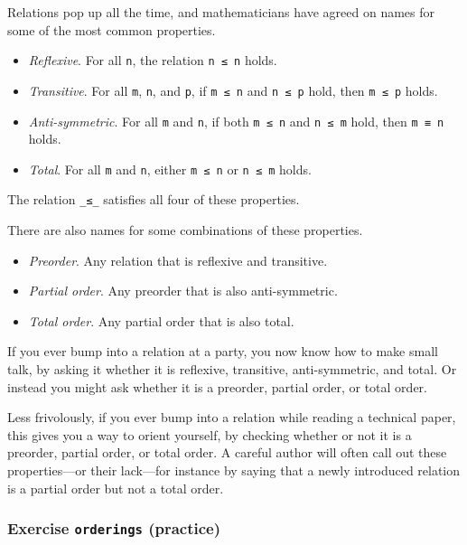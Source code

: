 Relations pop up all the time, and mathematicians have agreed on names
for some of the most common properties.

\begin{itemize}
\tightlist
\item
  \emph{Reflexive}. For all \texttt{n}, the relation \texttt{n\ ≤\ n}
  holds.
\item
  \emph{Transitive}. For all \texttt{m}, \texttt{n}, and \texttt{p}, if
  \texttt{m\ ≤\ n} and \texttt{n\ ≤\ p} hold, then \texttt{m\ ≤\ p}
  holds.
\item
  \emph{Anti-symmetric}. For all \texttt{m} and \texttt{n}, if both
  \texttt{m\ ≤\ n} and \texttt{n\ ≤\ m} hold, then \texttt{m\ ≡\ n}
  holds.
\item
  \emph{Total}. For all \texttt{m} and \texttt{n}, either
  \texttt{m\ ≤\ n} or \texttt{n\ ≤\ m} holds.
\end{itemize}

The relation \texttt{\_≤\_} satisfies all four of these properties.

There are also names for some combinations of these properties.

\begin{itemize}
\tightlist
\item
  \emph{Preorder}. Any relation that is reflexive and transitive.
\item
  \emph{Partial order}. Any preorder that is also anti-symmetric.
\item
  \emph{Total order}. Any partial order that is also total.
\end{itemize}

If you ever bump into a relation at a party, you now know how to make
small talk, by asking it whether it is reflexive, transitive,
anti-symmetric, and total. Or instead you might ask whether it is a
preorder, partial order, or total order.

Less frivolously, if you ever bump into a relation while reading a
technical paper, this gives you a way to orient yourself, by checking
whether or not it is a preorder, partial order, or total order. A
careful author will often call out these properties---or their
lack---for instance by saying that a newly introduced relation is a
partial order but not a total order.

\hypertarget{Relations-orderings}{%
\subsubsection{\texorpdfstring{Exercise \texttt{orderings}
(practice)}{Exercise orderings (practice)}}\label{Relations-orderings}}

